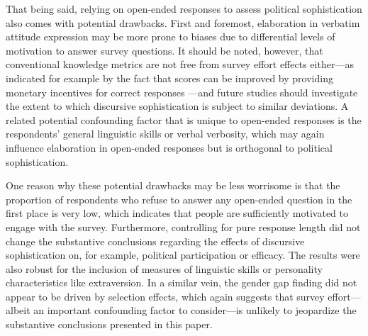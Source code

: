 That being said, relying on open-ended responses to assess political sophistication also comes with potential drawbacks. First and foremost, elaboration in verbatim attitude expression may be more prone to biases due to differential levels of motivation to answer survey questions. It should be noted, however, that conventional knowledge metrics are not free from survey effort effects either---as indicated for example by the fact that scores can be improved by providing monetary incentives for correct responses \citep{prior2008money}---and future studies should investigate the extent to which discursive sophistication is subject to similar deviations. A related potential confounding factor that is unique to open-ended responses is the respondents' general linguistic skills or verbal verbosity, which may again influence elaboration in open-ended responses but is orthogonal to political sophistication.

One reason why these potential drawbacks may be less worrisome is that the proportion of respondents who refuse to answer any open-ended question in the first place is very low, which indicates that people are sufficiently motivated to engage with the survey. Furthermore, controlling for pure response length did not change the substantive conclusions regarding the effects of discursive sophistication on, for example, political participation or efficacy. The results were also robust for the inclusion of measures of linguistic skills or personality characteristics like extraversion. In a similar vein, the gender gap finding did not appear to be driven by selection effects, which again suggests that survey effort---albeit an important confounding factor to consider---is unlikely to jeopardize the substantive conclusions presented in this paper.


